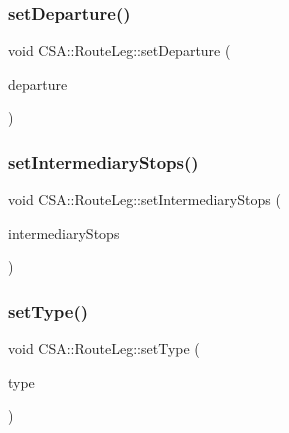 \subsubsection{\texorpdfstring{set\+Departure()}{setDeparture()}}
{\footnotesize\ttfamily void C\+S\+A\+::\+Route\+Leg\+::set\+Departure (\begin{DoxyParamCaption}\item[{\mbox{\hyperlink{classCSA_1_1RouteLegEnd}{C\+S\+A\+::\+Route\+Leg\+End}} $\ast$}]{departure }\end{DoxyParamCaption})}

\mbox{\label{classCSA_1_1RouteLeg_aa01b151e07580a55b7fec9a1cadfc9bb}} 
\subsubsection{\texorpdfstring{set\+Intermediary\+Stops()}{setIntermediaryStops()}}
{\footnotesize\ttfamily void C\+S\+A\+::\+Route\+Leg\+::set\+Intermediary\+Stops (\begin{DoxyParamCaption}\item[{const Q\+List$<$ \mbox{\hyperlink{classCSA_1_1VehicleStop}{C\+S\+A\+::\+Vehicle\+Stop}} $\ast$$>$ \&}]{intermediary\+Stops }\end{DoxyParamCaption})}

\mbox{\label{classCSA_1_1RouteLeg_a8a175ba408df0aeb3a345f57ce65db5b}} 
\subsubsection{\texorpdfstring{set\+Type()}{setType()}}
{\footnotesize\ttfamily void C\+S\+A\+::\+Route\+Leg\+::set\+Type (\begin{DoxyParamCaption}\item[{const \mbox{\hyperlink{classCSA_1_1RouteLeg_a464547cf160a77a2014d101560b1f77b}{C\+S\+A\+::\+Route\+Leg\+::\+Type}} \&}]{type }\end{DoxyParamCaption})}

\mbox{\label{classCSA_1_1RouteLeg_a88faef67ebfa683c1ea15f8e672f16c3}} 
